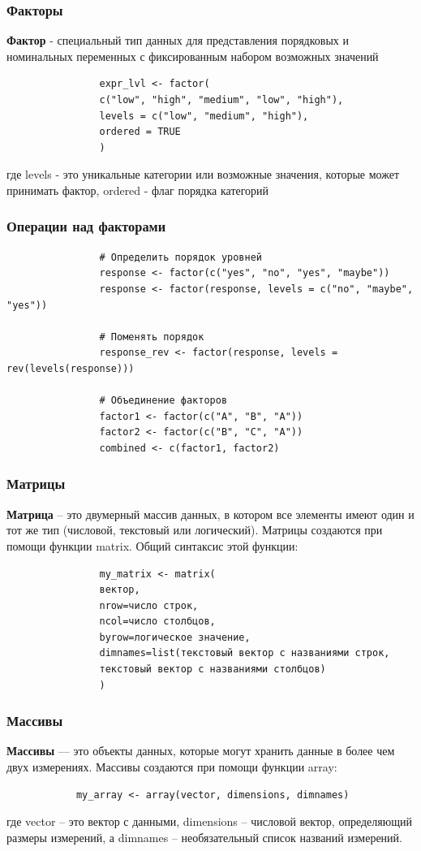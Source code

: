 \documentclass[11pt,a4paper]{beamer}
\begin{document}
	
	
	
	
	\begin{frame}[fragile]
		\frametitle{Факторы}
		\textbf{Фактор} - специальный тип данных для представления порядковых и номинальных переменных с фиксированным набором возможных значений
		{\fontsize{9}{10}\selectfont
			\begin{verbatim}
				expr_lvl <- factor(
				c("low", "high", "medium", "low", "high"),
				levels = c("low", "medium", "high"), 
				ordered = TRUE
				)
			\end{verbatim}
		}
		где levels - это уникальные категории или возможные значения, которые может принимать фактор, ordered - флаг порядка категорий
	\end{frame}
	
	\begin{frame}[fragile]
		\frametitle{Операции над факторами}
		{\fontsize{8}{10}\selectfont
			\begin{verbatim}
				# Определить порядок уровней
				response <- factor(c("yes", "no", "yes", "maybe"))
				response <- factor(response, levels = c("no", "maybe", "yes"))
				
				# Поменять порядок
				response_rev <- factor(response, levels = rev(levels(response)))
				
				# Объединение факторов
				factor1 <- factor(c("A", "B", "A"))
				factor2 <- factor(c("B", "C", "A"))
				combined <- c(factor1, factor2)		
			\end{verbatim}
		}
	\end{frame}
	
	
	\begin{frame}[fragile]
		\frametitle{Матрицы}
		\textbf{Матрица} – это двумерный массив данных, в котором все элементы имеют один и тот же тип (числовой, текстовый или логический). Матрицы создаются при помощи функции matrix. Общий синтаксис этой функции:
		{\fontsize{9}{10}\selectfont
			\begin{verbatim}
				my_matrix <- matrix(
				вектор, 
				nrow=число строк, 
				ncol=число столбцов, 
				byrow=логическое значение, 
				dimnames=list(текстовый вектор с названиями строк, 
				текстовый вектор с названиями столбцов)
				)
			\end{verbatim}
		}	
		
	\end{frame}
	
	\begin{frame}[fragile]
		\frametitle{Массивы}
		\textbf{Массивы} — это объекты данных, которые могут хранить данные в более чем двух измерениях. Массивы создаются при помощи функции array:
		
		\begin{verbatim}
			my_array <- array(vector, dimensions, dimnames)
		\end{verbatim}
		где vector – это вектор с данными, dimensions – числовой вектор, определяющий размеры измерений, а dimnames – необязательный список названий измерений.	
	\end{frame}
	
\end{document}
